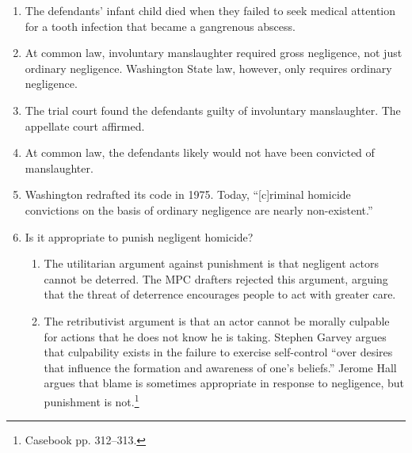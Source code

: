 \begin{enumerate}
    \item The defendants' infant child died when they failed to seek medical attention for a tooth infection that became a gangrenous abscess.
    \item At common law, involuntary manslaughter required gross negligence, not just ordinary negligence. Washington State law, however, only requires ordinary negligence.
    \item The trial court found the defendants guilty of involuntary manslaughter. The appellate court affirmed.
    \item At common law, the defendants likely would not have been convicted of manslaughter.
    \item Washington redrafted its code in 1975. Today, ``[c]riminal homicide convictions on the basis of ordinary negligence are nearly non-existent.''
    \item Is it appropriate to punish negligent homicide?
    \begin{enumerate}
        \item The utilitarian argument against punishment is that negligent actors cannot be deterred. The MPC drafters rejected this argument, arguing that the threat of deterrence encourages people to act with greater care.
        \item The retributivist argument is that an actor cannot be morally culpable for actions that he does not know he is taking. Stephen Garvey argues that culpability exists in the failure to exercise self-control ``over desires that influence the formation and awareness of one's beliefs.'' Jerome Hall argues that blame is sometimes appropriate in response to negligence, but punishment is not.\footnote{Casebook pp. 312--313.}
    \end{enumerate}
\end{enumerate}

% 
% 
% 
% 
% 

